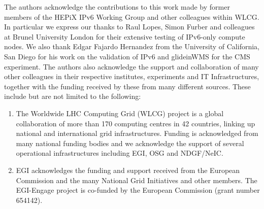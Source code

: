 
The authors acknowledge the contributions to this work made by former members of the HEPiX IPv6 Working Group and other colleagues within WLCG. In particular we express our thanks to Raul Lopes, Simon Furber and colleagues at Brunel University London for their extensive testing of IPv6-only compute nodes. We also thank Edgar Fajardo Hernandez from the University of California, San Diego for his work on the validation of IPv6 and glideinWMS for the CMS experiment. The authors also acknowledge the support and collaboration of many other colleagues in their respective institutes, experiments and IT Infrastructures, together with the funding received by these from many different sources. These include but are not limited to the following:
\begin{enumerate}

\item The Worldwide LHC Computing Grid (WLCG) project is a global collaboration of more than 170 computing centres in 42 countries, linking up national and international grid infrastructures. Funding is acknowledged from many national funding bodies and we acknowledge the support of several operational infrastructures including EGI, OSG and NDGF/NeIC.

\item EGI acknowledges the funding and support received from the European Commission and the many National Grid Initiatives and other members. The EGI-Engage project is co-funded by the European Commission (grant number 654142).

\end{enumerate}




